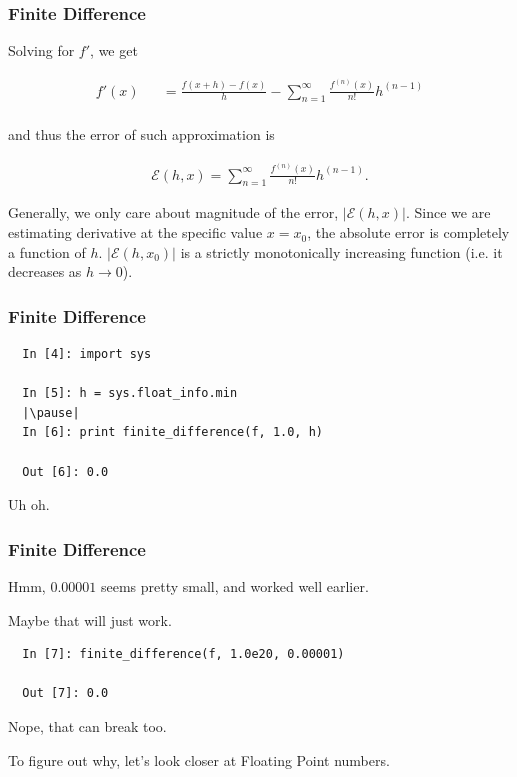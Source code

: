 \documentclass{beamer}
\begin{document}
\begin{frame}[fragile]
\frametitle{Finite Difference}

Solving for $f'$, we get

\begin{eqnarray*} f'(x) && = \frac{f(x+h) - f(x)}{h} - \sum_{n = 1}^{\infty} \frac{f^{(n)}(x)}{n!}h^{(n-1)} \\ \end{eqnarray*}

and thus the error of such approximation is

\begin{eqnarray*} \mathcal{E}(h, x) = \sum_{n = 1}^{\infty} \frac{f^{(n)}(x)}{n!}h^{(n-1)}. \end{eqnarray*}

Generally, we only care about magnitude of the error, $\left \vert \mathcal{E}(h,x) \right \vert$. Since we are estimating derivative at the specific value $x = x_0$, the absolute error is completely a function of $h$. $\left \vert \mathcal{E}(h, x_0) \right \vert$ is a strictly monotonically increasing function (i.e. it decreases as $h \to 0$).

\end{frame}

\begin{frame}[fragile]
\frametitle{Finite Difference}

\begin{lstlisting}
  In [4]: import sys

  In [5]: h = sys.float_info.min
  |\pause|
  In [6]: print finite_difference(f, 1.0, h)

  Out [6]: 0.0
\end{lstlisting}


Uh oh.

\end{frame}

\begin{frame}[fragile]
\frametitle{Finite Difference}

Hmm, $0.00001$ seems pretty small, and worked well earlier.

Maybe that will just work.

\pause

\begin{lstlisting}
  In [7]: finite_difference(f, 1.0e20, 0.00001)

  Out [7]: 0.0
\end{lstlisting}

Nope, that can break too.

To figure out why, let's look closer at Floating Point numbers.

\end{frame}
\end{document}
